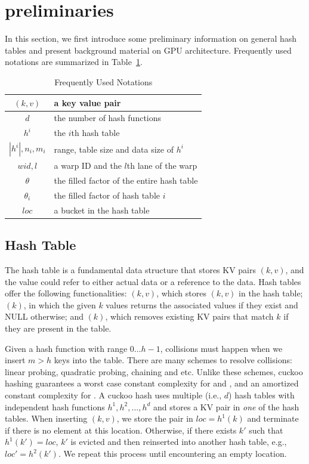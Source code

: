 \section{preliminaries}\label{sec:pre}
In this section, we first introduce some preliminary information on general hash tables and  present background material on GPU architecture. Frequently used notations are summarized in Table~\ref{tbl:stat:datasets}.

\begin{table}
	\centering
	\caption{Frequently Used Notations}
	\vspace{-1.5em}
	\label{tbl:stat:datasets}
	\begin{tabular}{|c|l|}
		\hline
		$(k,v)$ & a key value pair \\ \hline
		$d$		& the number of hash functions \\ \hline
		$h^i$	& the $i$th hash table \\ \hline
		$|h^i|,n_i,m_i$	& range, table size and data size of $h^i$ \\ \hline
		$wid,l$	& a warp ID and the $l$th lane of the warp \\ \hline
		$\theta$& the filled factor of the entire hash table \\ \hline
		$\theta_i$& the filled factor of hash table $i$ \\ \hline
		$loc$	& a bucket in the hash table \\ \hline
	\end{tabular}
\end{table}

\subsection{Hash Table}
The hash table is a fundamental data structure that stores KV pairs $(k,v)$, and the value could refer to either actual data or a reference to the data.
Hash tables offer the following functionalities: $(k,v)$, which stores $(k,v)$ in the hash table; $(k)$, in which the given $k$ values returns the associated values if they exist and NULL otherwise; and $(k)$, which removes existing KV pairs that match $k$ if they are present in the table.

Given a hash function with range $0 \ldots h-1$, collisions must happen when we insert $m>h$ keys into the table. There are many schemes to resolve collisions: linear probing, quadratic probing, chaining and etc. Unlike these schemes, cuckoo hashing \cite{pagh2004cuckoo} guarantees a worst case constant complexity for  and ,  and an amortized constant complexity for . A cuckoo hash uses multiple (i.e., $d$) hash tables with independent hash functions $h^1,h^2,\ldots,h^d$ and stores a KV pair in \emph{one} of the hash tables. When inserting $(k,v)$, we store the pair in $loc=h^1(k)$ and terminate if there is no element at this location. Otherwise, if there exists $k'$ such that $h^1(k')=loc$, $k'$ is evicted and then reinserted into another hash table, e.g., $loc'=h^2(k')$.
We repeat this process until encountering an empty location.

